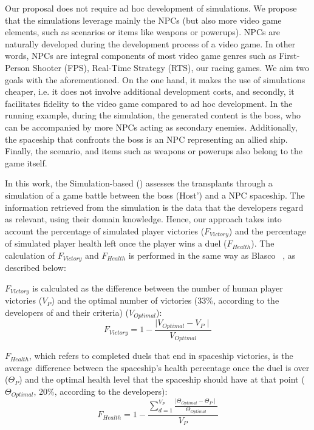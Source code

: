 Our proposal does not require ad hoc development of simulations. We propose that the simulations leverage mainly the NPCs (but also more video game elements, such as scenarios or items like weapons or powerups). NPCs are naturally developed during the development process of a video game. In other words, NPCs are integral components of  most video game genres such as First-Person Shooter (FPS), Real-Time Strategy (RTS), our racing games. We aim two goals with the aforementioned. On the one hand, it makes the use of simulations cheaper, i.e. it does not involve additional development costs, and secondly, it facilitates fidelity to the video game compared to ad hoc development. In the running example, during the simulation, the generated content is the boss, who can be accompanied by more NPCs acting as secondary enemies. Additionally, the spaceship that confronts the boss is an NPC representing an allied ship. Finally, the scenario, and items such as weapons or powerups also belong to the game itself.

In this work, the Simulation-based \ApproachName{} (\simhotep{}) assesses the transplants through a simulation of a game battle between the boss (Host') and a NPC spaceship. The information retrieved from the simulation is the data that the developers regard as relevant, using their domain knowledge. Hence, our approach takes into account  the percentage of simulated player victories ($F_{Victory}$) and the percentage of simulated player health left once the player wins a duel ($F_{Health}$).
The calculation of $F_{Victory}$ and $F_{Health}$ is performed in the same way as Blasco \etal~\cite{blasco2021evolutionary}, as described below:

$F_{Victory}$ is calculated as the difference between the number of human player victories ($V_{P}$) and the optimal number of victories (33\%, according to the developers of \CaseStudy{} and their criteria) ($V_{Optimal}$):
\begin{equation}
F_{Victory} = 1 -\frac{\mid V_{Optimal} - V_{P} \mid}{ V_{Optimal}}
\end{equation}

$F_{Health}$, which refers to completed duels that end in spaceship victories, is the average difference between the spaceship's health percentage once the duel is over ($\Theta_{P}$) and the optimal health level that the spaceship should have at that point ($\Theta_{Optimal}$, 20\%, according to the developers):
\begin{equation}
F_{Health} = 1 - \frac{\sum\limits_{d=1}^{V_{P}}\frac{\mid \Theta_{Optimal} - \Theta_{P} \mid}{ \Theta_{Optimal}}}{V_{P}}
\end{equation}

